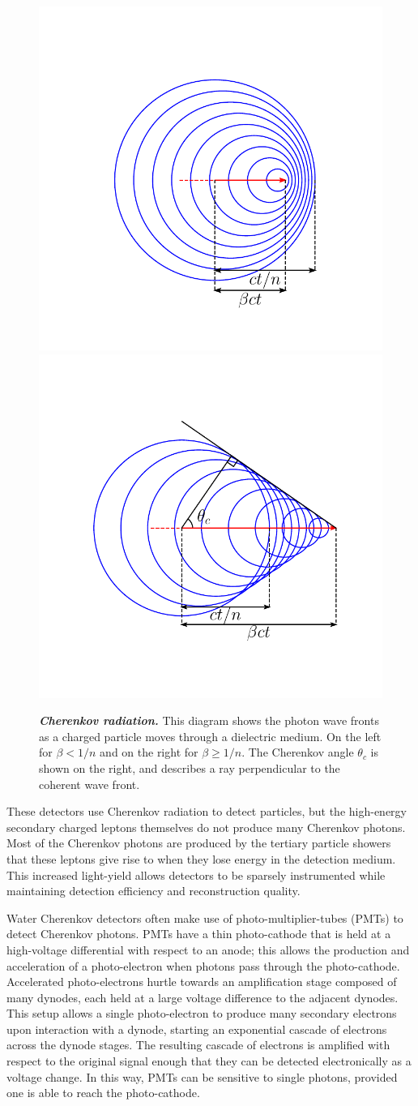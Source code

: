 \begin{figure}
	\centering
	\includegraphics[width=0.45\linewidth]{figures/no_cherenkov}
	\includegraphics[width=0.45\linewidth]{figures/cherenkov}
	\internallinenumbers
	\caption{\textbf{\textit{Cherenkov radiation.}}
		This diagram shows the photon wave fronts as a charged particle moves through a dielectric medium.
		On the left for $\beta < 1/n$ and on the right for $\beta \geq 1/n$.
		The Cherenkov angle $\theta_c$ is shown on the right, and describes a ray perpendicular to the coherent wave front.
	}\label{fig:cherenkov}
\end{figure}

These detectors use Cherenkov radiation to detect particles, but the high-energy secondary charged leptons themselves do not produce many Cherenkov photons.
Most of the Cherenkov photons are produced by the tertiary particle showers that these leptons give rise to when they lose energy in the detection medium.
This increased light-yield allows detectors to be sparsely instrumented while maintaining detection efficiency and reconstruction quality.

Water Cherenkov detectors often make use of photo-multiplier-tubes (PMTs) to detect Cherenkov photons.
PMTs have a thin photo-cathode that is held at a high-voltage differential with respect to an anode; this allows the production and acceleration of a photo-electron when photons pass through the photo-cathode.
Accelerated photo-electrons hurtle towards an amplification stage composed of many dynodes, each held at a large voltage difference to the adjacent dynodes.
This setup allows a single photo-electron to produce many secondary electrons upon interaction with a dynode, starting an exponential cascade of electrons across the dynode stages.
The resulting cascade of electrons is amplified with respect to the original signal enough that they can be detected electronically as a voltage change.
In this way, PMTs can be sensitive to single photons, provided one is able to reach the photo-cathode.